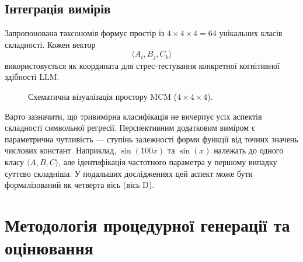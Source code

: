 \documentclass[11pt]{article}
\begin{document}
\subsection{Інтеграція вимірів}

Запропонована таксономія формує простір із $4\times4\times4=64$ унікальних класів складності. Кожен вектор
\[
\langle A_i,B_j,C_k\rangle
\]
використовується як координата для стрес-тестування конкретної когнітивної здібності LLM.

\begin{figure}[h]
\centering
{}
\caption{Схематична візуалізація простору MCM ($4\times4\times4$).}
\end{figure}

Варто зазначити, що тривимірна класифікація не вичерпує усіх аспектів складності символьної регресії. Перспективним додатковим виміром є параметрична чутливість --- ступінь залежності форми функції від точних значень числових констант. Наприклад, $\sin(100x)$ та $\sin(x)$ належать до одного класу $\langle A,B,C\rangle$, але ідентифікація частотного параметра у першому випадку суттєво складніша. У подальших дослідженнях цей аспект може бути формалізований як четверта вісь (вісь D).

\section{Методологія процедурної генерації та оцінювання}
\end{document}
